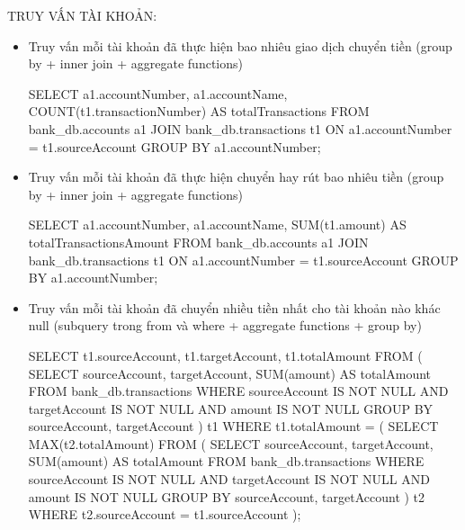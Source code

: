 TRUY VẤN TÀI KHOẢN:
\begin{itemize}

    \item Truy vấn mỗi tài khoản đã thực hiện bao nhiêu giao dịch chuyển tiền (group by + inner join + aggregate functions)
    \begin{MySQLCode}
    SELECT 
        a1.accountNumber,
        a1.accountName,
        COUNT(t1.transactionNumber) AS totalTransactions
    FROM 
        bank_db.accounts a1
    JOIN 
        bank_db.transactions t1 ON a1.accountNumber = t1.sourceAccount
    GROUP BY 
        a1.accountNumber;
    \end{MySQLCode}

    \item Truy vấn mỗi tài khoản đã thực hiện chuyển hay rút bao nhiêu tiền (group by + inner join + aggregate functions)
    \begin{MySQLCode}
    SELECT 
        a1.accountNumber,
        a1.accountName,
        SUM(t1.amount) AS totalTransactionsAmount
    FROM 
        bank_db.accounts a1
    JOIN 
        bank_db.transactions t1 ON a1.accountNumber = t1.sourceAccount
    GROUP BY 
        a1.accountNumber;
    \end{MySQLCode}

    \item Truy vấn mỗi tài khoản đã chuyển nhiều tiền nhất cho tài khoản nào khác null (subquery trong from và where + aggregate functions + group by)
    \begin{MySQLCode}
    SELECT 
        t1.sourceAccount, 
        t1.targetAccount, 
        t1.totalAmount
    FROM (
        SELECT 
            sourceAccount, 
            targetAccount, 
            SUM(amount) AS totalAmount
        FROM 
            bank_db.transactions
        WHERE 
            sourceAccount IS NOT NULL 
            AND targetAccount IS NOT NULL 
            AND amount IS NOT NULL
        GROUP BY 
            sourceAccount, targetAccount
    ) t1
    WHERE 
        t1.totalAmount = (
            SELECT 
                MAX(t2.totalAmount)
            FROM (
                SELECT 
                    sourceAccount, 
                    targetAccount, 
                    SUM(amount) AS totalAmount
                FROM 
                    bank_db.transactions
                WHERE 
                    sourceAccount IS NOT NULL 
                    AND targetAccount IS NOT NULL 
                    AND amount IS NOT NULL
                GROUP BY 
                    sourceAccount, targetAccount
            ) t2
            WHERE 
                t2.sourceAccount = t1.sourceAccount
        );
    \end{MySQLCode}


\end{itemize}
